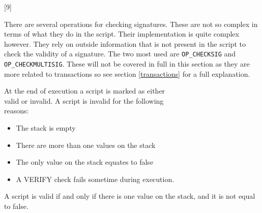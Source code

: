 \vspace{7mm}
[9]

There are several operations for checking signatures. These are not so complex in terms of what they do in the script. Their implementation is quite complex however. They rely on outside information that is not present in the script to check the validity of a signature.\cite{script_wiki}\cite{antonopoulos_2017} The two most used are \texttt{OP\_CHECKSIG} and \texttt{OP\_CHECKMULTISIG}. These will not be covered in full in this section as they are more related to transactions so see section \ref{transactions} for a full explanation. 

\label{script_valid}
At the end of execution a script is marked as either \\valid or invalid. A script is invalid for the following \\reasons\cite{antonopoulos_2017}:

\begin{itemize}
	\item The stack is empty
	\item There are more than one values on the stack
	\item The only value on the stack equates to false
	\item A VERIFY check fails sometime during execution.
\end{itemize}

A script is valid if and only if there is one value on the stack, and it is not equal to false.
